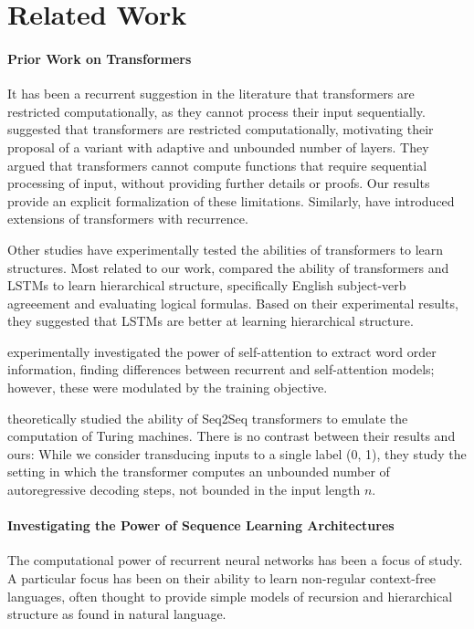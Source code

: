 \documentclass[11pt,a4paper]{article}
\begin{document}
\section{Related Work}

\paragraph{Prior Work on Transformers}
It has been a recurrent suggestion in the literature that transformers are restricted computationally, as they cannot process their input sequentially.
\cite{dehghani2018universal} suggested that transformers are restricted computationally, motivating their proposal of a variant with adaptive and unbounded number of layers.
They argued that transformers cannot compute functions that require sequential processing of input, without providing further details or proofs.
Our results provide an explicit formalization of these limitations.
Similarly, \cite{shen2018disan,chen2018best,hao2019modeling} have introduced extensions of transformers with recurrence.


Other studies have experimentally tested the abilities of transformers to learn structures.
Most related to our work, \cite{tran2018importance} compared the ability of transformers and LSTMs to learn hierarchical structure, specifically English subject-verb agreeement and evaluating logical formulas.
Based on their experimental results, they suggested that LSTMs are better at learning hierarchical structure.

\cite{yang2019assessing} experimentally investigated the power of self-attention to extract word order information, finding differences between recurrent and self-attention models; however, these were modulated by the training objective.

\cite{perez2019turing} theoretically studied the ability of Seq2Seq transformers to emulate the computation of Turing machines.
There is no contrast between their results and ours: While we consider transducing inputs to a single label (0, 1), they study the setting in which the transformer computes an unbounded number of autoregressive decoding steps, not bounded in the input length $n$.


\paragraph{Investigating the Power of Sequence Learning Architectures}
The computational power of recurrent neural networks has been a focus of study.
A particular focus has been on their ability to learn non-regular context-free languages, often thought to provide simple models of recursion and hierarchical structure as found in natural language.
\end{document}
